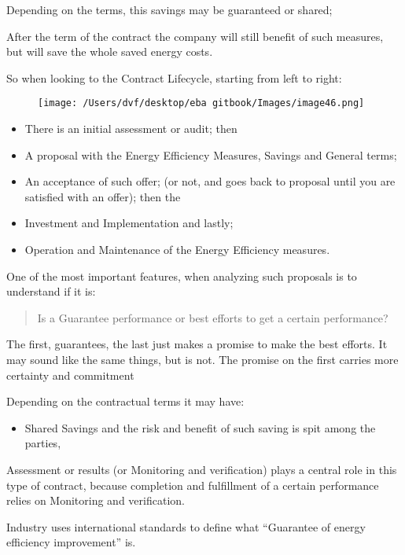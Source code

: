 \documentclass[]{book}
\providecommand{\tightlist}{%
  \setlength{\itemsep}{0pt}\setlength{\parskip}{0pt}}
\theoremstyle{definition}
\theoremstyle{definition}
\theoremstyle{definition}
\theoremstyle{remark}
\begin{document}
Depending on the terms, this savings may be guaranteed or shared;

After the term of the contract the company will still benefit of such
measures, but will save the whole saved energy costs.

So when looking to the Contract Lifecycle, starting from left to right:

\begin{figure}[htbp]
\centering
\texttt{[image: /Users/dvf/desktop/eba gitbook/Images/image46.png]}
\caption{}
\end{figure}

\begin{itemize}
\item
  There is an initial assessment or audit; then
\item
  A proposal with the Energy Efficiency Measures, Savings and General
  terms;
\item
  An acceptance of such offer; (or not, and goes back to proposal until
  you are satisfied with an offer); then the
\item
  Investment and Implementation and lastly;
\item
  Operation and Maintenance of the Energy Efficiency measures.
\end{itemize}

One of the most important features, when analyzing such proposals is to
understand if it is:

\begin{quote}
Is a Guarantee performance or best efforts to get a certain performance?
\end{quote}

The first, guarantees, the last just makes a promise to make the best
efforts. It may sound like the same things, but is not. The promise on
the first carries more certainty and commitment

Depending on the contractual terms it may have:

\begin{itemize}
\tightlist
\item
  Shared Savings and the risk and benefit of such saving is spit among
  the parties,
\end{itemize}

Assessment or results (or Monitoring and verification) plays a central
role in this type of contract, because completion and fulfillment of a
certain performance relies on Monitoring and verification.

Industry uses international standards to define what ``Guarantee of
energy efficiency improvement'' is.
\end{document}
